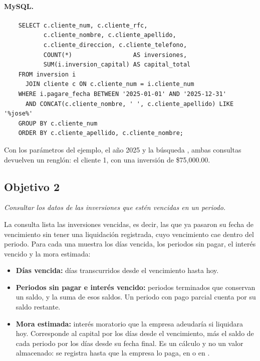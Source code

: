 \paragraph{MySQL.}

\begin{verbatim}
	SELECT c.cliente_num, c.cliente_rfc,
	       c.cliente_nombre, c.cliente_apellido,
	       c.cliente_direccion, c.cliente_telefono,
	       COUNT(*)                 AS inversiones,
	       SUM(i.inversion_capital) AS capital_total
	FROM inversion i
	  JOIN cliente c ON c.cliente_num = i.cliente_num
	WHERE i.pagare_fecha BETWEEN '2025-01-01' AND '2025-12-31'
	  AND CONCAT(c.cliente_nombre, ' ', c.cliente_apellido) LIKE '%jose%'
	GROUP BY c.cliente_num
	ORDER BY c.cliente_apellido, c.cliente_nombre;
\end{verbatim}

Con los par\'ametros del ejemplo, el a\~no 2025 y la b\'usqueda , ambas consultas devuelven un rengl\'on: el cliente 1, con una inversi\'on de \$75{,}000.00.


\subsection{Objetivo 2}

\textit{Consultar los datos de las inversiones que est\'en vencidas en un periodo.}

La consulta lista las inversiones vencidas, es decir, las que ya pasaron su fecha de vencimiento sin tener una liquidaci\'on registrada, cuyo vencimiento cae dentro del periodo. Para cada una muestra los d\'ias vencida, los periodos sin pagar, el inter\'es vencido y la mora estimada:

\begin{itemize}[leftmargin=*]
	\item \textbf{D\'ias vencida:} d\'ias transcurridos desde el vencimiento hasta hoy.
	\item \textbf{Periodos sin pagar e inter\'es vencido:} periodos terminados que conservan un saldo, y la suma de esos saldos. Un periodo con pago parcial cuenta por su saldo restante.
	\item \textbf{Mora estimada:} inter\'es moratorio que la empresa adeudar\'ia si liquidara hoy. Corresponde al capital por los d\'ias desde el vencimiento, m\'as el saldo de cada periodo por los d\'ias desde su fecha final. Es un c\'alculo y no un valor almacenado: se registra hasta que la empresa lo paga, en  o en .
\end{itemize}

